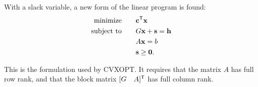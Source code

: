 With a slack variable, a new form of the linear program is found:
\begin{align*}
\mbox{minimize}\qquad &\mathbf{c}^{\mathsf T} \mathbf{x} \\
\mbox{subject to}\qquad &G\mathbf{x} + \mathbf{s} = \mathbf{h}\\
&A\mathbf{x} = b \\
&\mathbf{s} \geq \mathbf{0}.
\end{align*}

This is the formulation used by CVXOPT.
It requires that the matrix $A$ has full row rank,
and that the block matrix $[G \quad A]^{\mathsf T} $ has full column rank.


\begin{comment}
The corresponding \emph{dual program} for the above linear program has the form
\begin{align*}
\text{maximize}\qquad &-h\trp z - b\trp y \\
\text{subject to}\qquad &G\trp z + A\trp y + c = 0\\
 &z \geq 0.
\end{align*}
CVXOPT provides functions to solve both the original (\emph{primal}) linear program and its dual program.
\end{comment}

